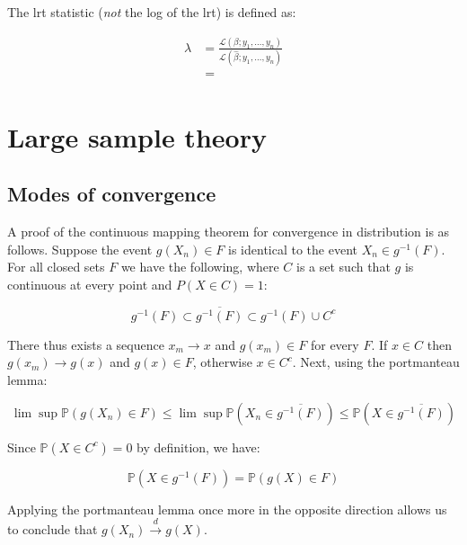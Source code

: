 \documentclass{report}
\begin{document}
The \gls{lrt} statistic (\textit{not} the log of the \gls{lrt}) is defined as: 

\begin{equation}
    \begin{aligned}
        \lambda 
          &= \frac{\mathcal{L}(\beta; y_1, \dots, y_n)}{\mathcal{L}\left(\hat{\beta}; y_1, \dots, y_n\right)} \\
          &= \frac{}{}
    \end{aligned}
\end{equation}

\section{Large sample theory}\label{sec:examples-lst}

\subsection{Modes of convergence}

A proof of the continuous mapping theorem for convergence in distribution is as follows. Suppose the event $g(X_n) \in F$ is identical to the event $X_n \in g^{-1}(F)$. For all closed sets $F$ we have the following, where $C$ is a set such that $g$ is continuous at every point and $P(X \in C) = 1$:

\begin{equation}\label{eq:ex-lst-cmt-dist-proof-1}
    g^{-1}(F) \subset \overline{g^{-1}(F)} \subset g^{-1}(F) \cup C^c
\end{equation}

There thus exists a sequence $x_m \to x$ and $g(x_m) \in F$ for every $F$. If $x \in C$ then $g(x_m) \to g(x)$ and $g(x) \in F$, otherwise $x \in C^c$. Next, using the portmanteau lemma:

\begin{equation}\label{eq:ex-lst-cmt-dist-proof-2}
    \lim \sup \mathbb{P}(g(X_n) \in F) \le \lim \sup \mathbb{P}\left(X_n \in \overline{g^{-1}(F)}\right) \le \mathbb{P}\left(X \in \overline{g^{-1}(F)}\right)
\end{equation}

Since $\mathbb{P}(X \in C^c) = 0$ by definition, we have:

\begin{equation}\label{eq:ex-lst-cmt-dist-proof-3}
    \mathbb{P}(X \in g^{-1}(F)) = \mathbb{P}(g(X) \in F)
\end{equation}

Applying the portmanteau lemma once more in the opposite direction allows us to conclude that $g(X_n) \overset{d}{\to} g(X)$. 
\end{document}
